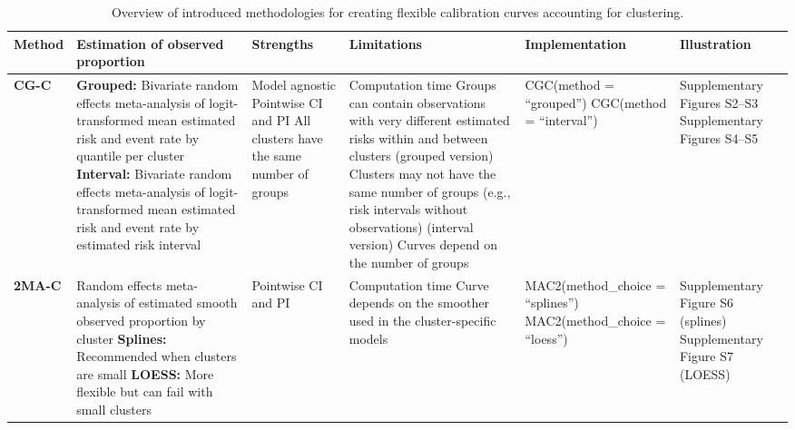 \begin{table}
\centering
\footnotesize
\begin{threeparttable}
\caption[Overview introduced methods]{Overview of introduced methodologies for creating flexible calibration curves accounting for clustering.}
\label{tab:4:1}
\begin{tabularx}{\linewidth}{
  l
  >{\raggedright\arraybackslash\hsize=1.3\hsize}X
  >{\raggedright\arraybackslash\hsize=0.7\hsize}X
  >{\raggedright\arraybackslash\hsize=1.4\hsize}X
  >{\raggedright\arraybackslash\hsize=0.9\hsize}X
  >{\raggedright\arraybackslash\hsize=0.7\hsize}X
}
\toprule
\textbf{Method} & \textbf{Estimation of observed proportion} & \textbf{Strengths} & \textbf{Limitations} & \textbf{Implementation} & \textbf{Illustration} \\
\midrule
\textbf{CG-C}& \textbf{Grouped:} Bivariate random effects meta-analysis of logit-transformed mean estimated risk and event rate by quantile per cluster \newline \textbf{Interval:} Bivariate random effects meta-analysis of logit-transformed mean estimated risk and event rate by estimated risk interval & Model agnostic \newline Pointwise CI and PI \newline All clusters have the same number of groups & Computation time \newline Groups can contain observations with very different estimated risks within and between clusters (grouped version) \newline Clusters may not have the same number of groups (e.g., risk intervals without observations) (interval version) \newline Curves depend on the number of groups & CGC(method = ``grouped'') \newline CGC(method = ``interval'') & Supplementary Figures S2--S3 \newline Supplementary Figures S4--S5 \\
\addlinespace
\textbf{2MA-C} & Random effects meta-analysis of estimated smooth observed proportion by cluster \newline \textbf{Splines:} Recommended when clusters are small \newline \textbf{LOESS:} More flexible but can fail with small clusters & Pointwise CI and PI & Computation time \newline Curve depends on the smoother used in the cluster-specific models & MAC2(method\_choice = ``splines'') \newline MAC2(method\_choice = ``loess'') & Supplementary Figure S6 (splines) \newline Supplementary Figure S7 (LOESS) \\

\end{tabularx}
\end{threeparttable}
\end{table}
